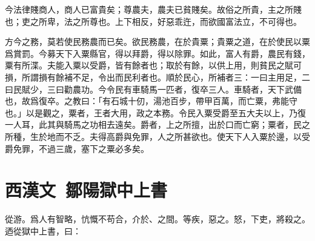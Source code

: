 今法律賤商人，商人已富貴矣；尊農夫，農夫已貧賤矣。故俗之所貴，主之所賤也；吏之所卑，法之所尊也。上下相反，好惡乖迕，而欲國富法立，不可得也。

方今之務，莫若使民務農而已矣。欲民務農，在於貴粟；貴粟之道，在於使民以粟爲賞罰。今募天下入粟縣官，得以拜爵，得以除罪。如此，富人有爵，農民有錢，粟有所渫。夫能入粟以受爵，皆有餘者也；取於有餘，以供上用，則貧民之賦可損，所謂損有餘補不足，令出而民利者也。順於民心，所補者三：一曰主用足，二曰民賦少，三曰勸農功。今令民有車騎馬一匹者，復卒三人。車騎者，天下武備也，故爲復卒。之教曰：「有石城十仞，湯池百步，帶甲百萬，而亡粟，弗能守也。」以是觀之，粟者，王者大用，政之本務。令民入粟受爵至五大夫以上，乃復一人耳，此其與騎馬之功相去遠矣。爵者，上之所擅，出於口而亡窮；粟者，民之所種，生於地而不乏。夫得高爵與免罪，人之所甚欲也。使天下人入粟於邊，以受爵免罪，不過三歲，塞下之粟必多矣。

\theendnotes

\section[鄒陽獄中上梁王書\quad{\small 西漢文}]{{\normalsize 西漢文\ 鄒陽}\quad 獄中上書}
從游。爲人有智略，忼慨不苟合，介於、之間。等疾，惡之。怒，下吏，將殺之。迺從獄中上書，曰：

